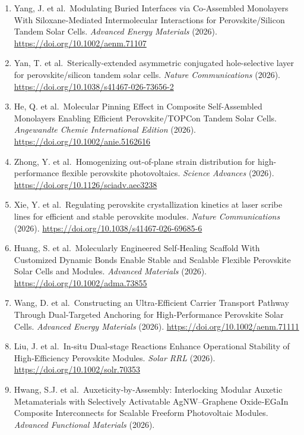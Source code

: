 \documentclass[
  11pt,
]{article}
\begin{document}
\begin{enumerate}
  for controllable surface energetics of photovoltaic perovskites.
  \emph{Science Advances} (2026).
  \url{https://doi.org/10.1126/sciadv.aec4431}
\item
  Yang, J. et al.~Modulating Buried Interfaces via Co‐Assembled
  Monolayers With Siloxane‐Mediated Intermolecular Interactions for
  Perovskite/Silicon Tandem Solar Cells. \emph{Advanced Energy
  Materials} (2026). \url{https://doi.org/10.1002/aenm.71107}
\item
  Yan, T. et al.~Sterically-extended asymmetric conjugated
  hole-selective layer for perovskite/silicon tandem solar cells.
  \emph{Nature Communications} (2026).
  \url{https://doi.org/10.1038/s41467-026-73656-2}
\item
  He, Q. et al.~Molecular Pinning Effect in Composite Self‐Assembled
  Monolayers Enabling Efficient Perovskite/TOPCon Tandem Solar Cells.
  \emph{Angewandte Chemie International Edition} (2026).
  \url{https://doi.org/10.1002/anie.5162616}
\item
  Zhong, Y. et al.~Homogenizing out-of-plane strain distribution for
  high-performance flexible perovskite photovoltaics. \emph{Science
  Advances} (2026). \url{https://doi.org/10.1126/sciadv.aec3238}
\item
  Xie, Y. et al.~Regulating perovskite crystallization kinetics at laser
  scribe lines for efficient and stable perovskite modules. \emph{Nature
  Communications} (2026).
  \url{https://doi.org/10.1038/s41467-026-69685-6}
\item
  Huang, S. et al.~Molecularly Engineered Self‐Healing Scaffold With
  Customized Dynamic Bonds Enable Stable and Scalable Flexible
  Perovskite Solar Cells and Modules. \emph{Advanced Materials} (2026).
  \url{https://doi.org/10.1002/adma.73855}
\item
  Wang, D. et al.~Constructing an Ultra‐Efficient Carrier Transport
  Pathway Through Dual‐Targeted Anchoring for High‐Performance
  Perovskite Solar Cells. \emph{Advanced Energy Materials} (2026).
  \url{https://doi.org/10.1002/aenm.71111}
\item
  Liu, J. et al.~In‐situ Dual‐stage Reactions Enhance Operational
  Stability of High‐Efficiency Perovskite Modules. \emph{Solar RRL}
  (2026). \url{https://doi.org/10.1002/solr.70353}
\item
  Hwang, S.J. et al.~Auxeticity‐by‐Assembly: Interlocking Modular
  Auxetic Metamaterials with Selectively Activatable AgNW--Graphene
  Oxide‐EGaIn Composite Interconnects for Scalable Freeform Photovoltaic
  Modules. \emph{Advanced Functional Materials} (2026).

\end{enumerate}
\end{document}
